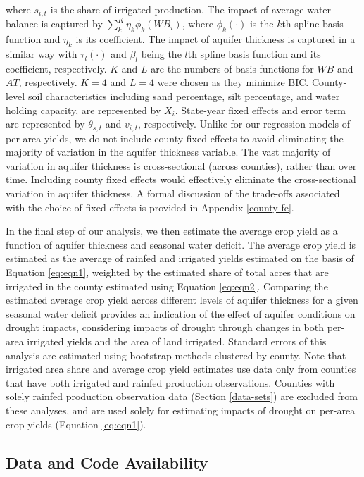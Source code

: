 \documentclass[
]{article}
\begin{document}
where \(s_{i,t}\) is the share of irrigated production. The impact of average water balance is captured by \(\sum_{k}^K \eta_{k}\phi_{k}(WB_{i})\), where \(\phi_{k}(\cdot)\) is the \(k\)th spline basis function and \(\eta_{k}\) is its coefficient. The impact of aquifer thickness is captured in a similar way with \(\tau_{l}(\cdot)\) and \(\beta_{l}\) being the \(l\)th spline basis function and its coefficient, respectively. $K$ and $L$ are the numbers of basis functions for $WB$ and $AT$, respectively. $K = 4$ and $L = 4$ were chosen as they minimize BIC. County-level soil characteristics including sand percentage, silt percentage, and water holding capacity, are represented by \(X_i\). State-year fixed effects and error term are represented by \(\theta_{s,t}\) and \(v_{i,t}\), respectively. Unlike for our regression models of per-area yields, we do not include county fixed effects to avoid eliminating the majority of variation in the aquifer thickness variable. The vast majority of variation in aquifer thickness is cross-sectional (across counties), rather than over time. Including county fixed effects would effectively eliminate the cross-sectional variation in aquifer thickness. A formal discussion of the trade-offs associated with the choice of fixed effects is provided in Appendix \ref{county-fe}.

In the final step of our analysis, we then estimate the average crop yield as a function of aquifer thickness and seasonal water deficit. The average crop yield is estimated as the average of rainfed and irrigated yields estimated on the basis of Equation \eqref{eq:eqn1}, weighted by the estimated share of total acres that are irrigated in the county estimated using Equation \eqref{eq:eqn2}. Comparing the estimated average crop yield across different levels of aquifer thickness for a given seasonal water deficit provides an indication of the effect of aquifer conditions on drought impacts, considering impacts of drought through changes in both per-area irrigated yields and the area of land irrigated. Standard errors of this analysis are estimated using bootstrap methods clustered by county. Note that irrigated area share and average crop yield estimates use  data only from counties that have both irrigated and rainfed production observations. Counties with solely rainfed production observation data (Section \ref{data-sets}) are excluded from these analyses, and are used solely for estimating impacts of drought on per-area crop yields (Equation \ref{eq:eqn1}).

\hypertarget{data-and-code-availability}{%
\subsection{Data and Code Availability}\label{data-and-code-availability}}
\end{document}

